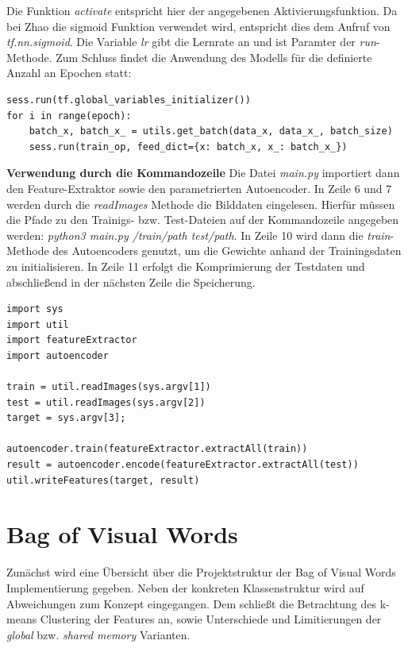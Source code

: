 Die Funktion \textit{activate} entspricht hier der angegebenen Aktivierungsfunktion. Da bei Zhao die sigmoid Funktion verwendet wird, entspricht dies dem Aufruf von \textit{tf.nn.sigmoid}. Die Variable \textit{lr} gibt die Lernrate an und ist Paramter der \textit{run}-Methode. Zum Schluss findet die Anwendung des Modells für die definierte Anzahl an Epochen statt: 

\begin{lstlisting}[style=Python]
sess.run(tf.global_variables_initializer())
for i in range(epoch):
	batch_x, batch_x_ = utils.get_batch(data_x, data_x_, batch_size)
	sess.run(train_op, feed_dict={x: batch_x, x_: batch_x_})
\end{lstlisting}

\textbf{Verwendung durch die Kommandozeile} Die Datei \textit{main.py} importiert dann den Feature-Extraktor sowie den parametrierten Autoencoder. In Zeile 6 und 7 werden durch die \textit{readImages} Methode die Bilddaten eingelesen. Hierfür müssen die Pfade zu den Trainigs- bzw. Test-Dateien auf der Kommandozeile angegeben werden: \textit{python3 main.py /train/path test/path}. In Zeile 10 wird dann die \textit{train}-Methode des Autoencoders genutzt, um die Gewichte anhand der Trainingsdaten zu initialisieren. In Zeile 11 erfolgt die Komprimierung der Testdaten und abschließend in der nächsten Zeile die Speicherung.

\begin{lstlisting}[style=Python]
import sys
import util
import featureExtractor
import autoencoder

train = util.readImages(sys.argv[1])
test = util.readImages(sys.argv[2])
target = sys.argv[3];

autoencoder.train(featureExtractor.extractAll(train))
result = autoencoder.encode(featureExtractor.extractAll(test))
util.writeFeatures(target, result)
\end{lstlisting}

\section{Bag of Visual Words}

Zunächst wird eine Übersicht über die Projektstruktur der Bag of Visual Words Implementierung gegeben. Neben der konkreten Klassenstruktur wird auf Abweichungen zum Konzept eingegangen. Dem schließt die Betrachtung des k-means Clustering der Features an, sowie Unterschiede und Limitierungen der \textit{global} bzw. \textit{shared memory} Varianten.

